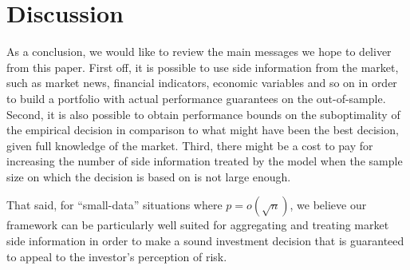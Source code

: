 \section{Discussion}\label{sec:conc}

As a conclusion, we would like to review the main messages we hope to deliver from this
paper. First off, it is possible to use side information from the market, such as market
news, financial indicators, economic variables and so on in order to build a portfolio
with actual performance guarantees on the out-of-sample. Second, it is also possible to
obtain performance bounds on the suboptimality of the empirical decision in comparison to
what might have been the best decision, given full knowledge of the market. Third, there
might be a cost to pay for increasing the number of side information treated by the model
when the sample size on which the decision is based on is not large enough.

That said, for ``small-data'' situations where $p=o(\sqrt{n})$, we believe our framework
can be particularly well suited for aggregating and treating market side information in
order to make a sound investment decision that is guaranteed to appeal to the investor's
perception of risk.



